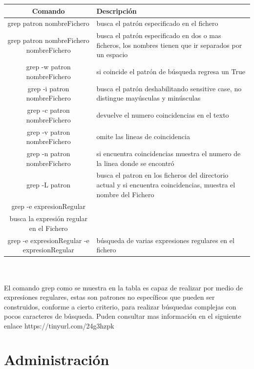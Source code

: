 \documentclass[10pt,a4paper,titlepage]{article}
\begin{document}
	\begin{tabular}{|c|p{8cm}|}
		\hline
		Comando & Descripción \\
		\hline
		grep patron nombreFichero & busca el patrón especificado en el fichero \\
		\hline
		grep patron nombreFichero nombreFichero & busca el patrón especificado en dos o mas ficheros, los nombres tienen que ir separados por un espacio \\
		\hline
		grep -w patron nombreFichero & si coincide el patrón de búsqueda regresa un True \\
		\hline
		grep -i patron nombreFichero & busca el patrón deshabilitando sensitive case, no distingue mayúsculas y minúsculas \\
		\hline
		grep -c patron nombreFichero & devuelve el numero coincidencias en el texto \\
		\hline
		grep -v patron nombreFichero & omite las lineas de coincidencia \\
		grep -n patron nombreFichero & si encuentra coincidencias muestra el numero de la linea donde se encontró \\
		\hline
		grep -L patron & busca el patron en los ficheros del directorio actual y si encuentra coincidencias, muestra el nombre del Fichero \\
		\hline
		grep -e expresionRegular \\ busca la expresión regular en el Fichero \\
		\hline
		grep -e expresionRegular -e expresionRegular & búsqueda de varias expresiones regulares en el fichero \\
		\hline
	\end{tabular}
	\\
	\\
	El comando grep como se muestra en la tabla es capaz de realizar por medio de expresiones regulares, estas son patrones no específicos que pueden ser construidos, conforme a cierto criterio, para realizar búsquedas complejas con pocos caracteres de búsqueda. Puden consultar mas información en el siguiente enlace https://tinyurl.com/24g3hzpk
	
	\section*{Administración}
	
\end{document}
